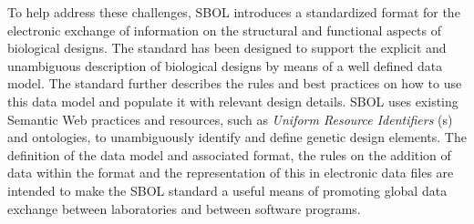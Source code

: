 To help address these challenges, SBOL introduces a standardized format for the electronic exchange of information on the structural and functional aspects of biological designs. 
The standard has been designed to support the explicit and unambiguous description of biological designs by means of a well defined data model. 
The standard further describes the rules and best practices on how to use this data model and populate it with relevant design details. 
SBOL uses existing Semantic Web practices and resources, such as \emph{Uniform Resource Identifiers} (s) and ontologies, to unambiguously identify and define genetic design elements.
The definition of the data model and associated format, the rules on the addition of data within the format and the representation of this in electronic data files are intended to make the SBOL standard a useful means of promoting global data exchange between laboratories and between software programs.


